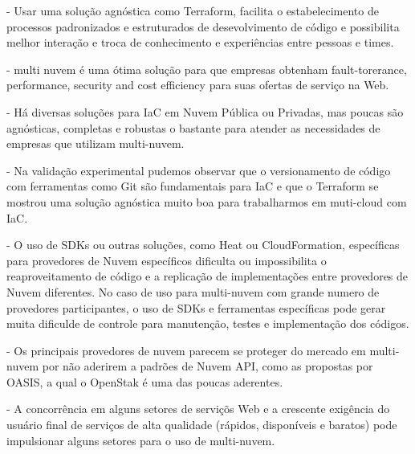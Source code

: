 \documentclass[12pt]{article}
\begin{document}
	- Usar uma solução agnóstica como Terraform, facilita o estabelecimento de processos padronizados e estruturados de desevolvimento de código e possibilita melhor interação e troca de conhecimento e experiências entre pessoas e times.
	
	- multi nuvem é uma ótima solução para que empresas obtenham fault-torerance, performance, security and cost efficiency para suas ofertas de serviço na Web.
	
	- Há diversas soluções para IaC em Nuvem Pública ou Privadas, mas poucas são agnósticas, completas e robustas o bastante para atender as necessidades de empresas que utilizam multi-nuvem.
	
	- Na validação experimental pudemos observar que o versionamento de código com ferramentas como Git são fundamentais para IaC e que o Terraform se mostrou uma solução agnóstica muito boa para trabalharmos em muti-cloud com IaC.
	
	- O uso de SDKs ou outras soluções, como Heat ou CloudFormation, específicas para provedores de Nuvem específicos dificulta ou impossibilita o reaproveitamento de código e a replicação de implementações entre provedores de Nuvem diferentes. No caso de uso para multi-nuvem com grande numero de provedores participantes, o uso de SDKs e ferramentas específicas pode gerar muita dificulde de controle para manutenção, testes e implementação dos códigos.
	
	- Os principais provedores de nuvem parecem se proteger do mercado em multi-nuvem por não aderirem a padrões de Nuvem API, como as propostas por OASIS, a qual o OpenStak é uma das poucas aderentes.
	
	- A concorrência em alguns setores de serviçõs Web e a crescente exigência do usuário final de serviços de alta qualidade (rápidos, disponíveis e baratos) pode impulsionar alguns setores para o uso de multi-nuvem.	
	
	
	
\end{document}

